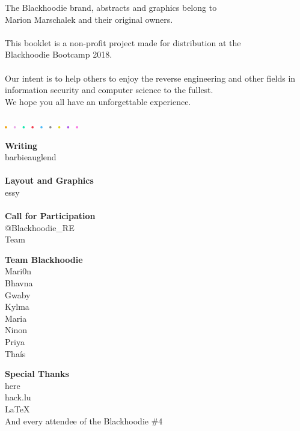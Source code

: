 \def\pagetitletext{}

\thispagestyle{empty}

\vspace*{\fill}
\begin{center}\footnotesize
The Blackhoodie brand, abstracts and graphics belong to\\Marion Marschalek and their original owners.\\
~\\
This booklet is a non-profit project made for distribution at the\\Blackhoodie Bootcamp 2018.\\
~\\
Our intent is to help others to enjoy the reverse engineering and other fields in information security and computer science to the fullest.\\We hope you all have an unforgettable experience.\\
~\\
\includegraphics[height=1mm,keepaspectratio]{images/dots_color.pdf}
\end{center}
\begin{multicols}{3}\footnotesize
\setlength{\columnseprule}{0pt}
\begin{center}
\textbf{Writing}\\barbieauglend\\
~\\
\textbf{Layout and Graphics}\\essy\\
~\\
\textbf{Call for Participation}\\@Blackhoodie\_RE\\Team
\end{center}
\columnbreak
\begin{center}
\textbf{Team Blackhoodie}\\Mari0n\\Bhavna\\Gwaby\\Kylma\\Maria\\Ninon\\Priya\\Thaís\\
\end{center}
\columnbreak
\begin{center}
\textbf{Special Thanks}\\here\\hack.lu\\LaTeX\\And every attendee of the Blackhoodie \#4
\end{center}
\end{multicols}
\vspace{-6em}

